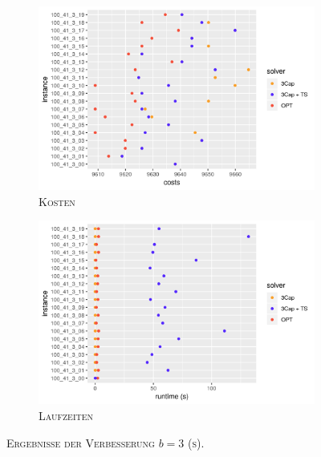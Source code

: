 \begin{figure}[H]
\centering
\begin{subfigure}[b]{0.49\textwidth}
\includegraphics[width=\textwidth]{img/imp_b=3_s_costs.png}
\caption{\textsc{Kosten}}
\label{fig:imp_b=3_s_costs}
\end{subfigure}
\hfill
\begin{subfigure}[b]{0.49\textwidth}
\includegraphics[width=\textwidth]{img/imp_b=3_s_runtimes.png}
\caption{\textsc{Laufzeiten}}
\label{fig:imp_b=3_s_runtimes}
\end{subfigure}
\caption{\textsc{Ergebnisse der Verbesserung $b = 3$ (s)}.}
\label{fig:imp_res_b=3_s}
\end{figure}

